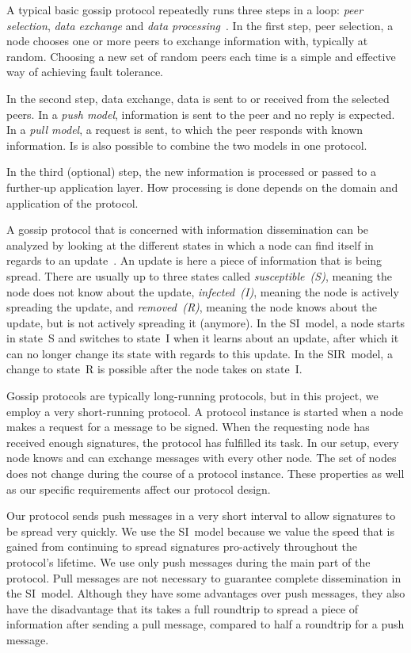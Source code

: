 A typical basic gossip protocol repeatedly runs three steps in a loop: \emph{peer selection}, \emph{data exchange} and \emph{data processing}~\cite{Kerm07}.
In the first step, peer selection, a node chooses one or more peers to exchange information with, typically at random.
Choosing a new set of random peers each time is a simple and effective way of achieving fault tolerance.

In the second step, data exchange, data is sent to or received from the selected peers.
In a \emph{push model}, information is sent to the peer and no reply is expected.
In a \emph{pull model}, a request is sent, to which the peer responds with known information.
Is is also possible to combine the two models in one protocol.

In the third (optional) step, the new information is processed or passed to a further-up application layer.
How processing is done depends on the domain and application of the protocol.

A gossip protocol that is concerned with information dissemination can be analyzed by looking at the different states in which a node can find itself in regards to an update~\cite{Jela13}.
An update is here a piece of information that is being spread.
There are usually up to three states called \emph{susceptible~(S)}, meaning the node does not know about the update, \emph{infected~(I)}, meaning the node is actively spreading the update, and \emph{removed~(R)}, meaning the node knows about the update, but is not actively spreading it (anymore).
In the SI~model, a node starts in state~S and switches to state~I when it learns about an update, after which it can no longer change its state with regards to this update.
In the SIR~model, a change to state~R is possible after the node takes on state~I.

Gossip protocols are typically long-running protocols, but in this project, we employ a very short-running protocol.
A protocol instance is started when a node makes a request for a message to be signed.
When the requesting node has received enough signatures, the protocol has fulfilled its task.
In our setup, every node knows and can exchange messages with every other node.
The set of nodes does not change during the course of a protocol instance.
These properties as well as our specific requirements affect our protocol design.

Our protocol sends push messages in a very short interval to allow signatures to be spread very quickly.
We use the SI~model because we value the speed that is gained from continuing to spread signatures pro-actively throughout the protocol's lifetime.
We use only push messages during the main part of the protocol.
Pull messages are not necessary to guarantee complete dissemination in the SI~model.
Although they have some advantages over push messages, they also have the disadvantage that its takes a full roundtrip to spread a piece of information after sending a pull message, compared to half a roundtrip for a push message.


